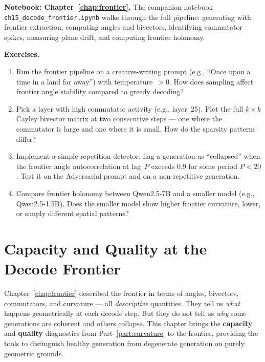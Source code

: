 \documentclass[11pt, twoside, openright]{memoir}
\numberwithin{equation}{chapter}
\begin{document}
\begin{tryit}
\textbf{Notebook: Chapter~\ref{chap:frontier}.}
The companion notebook
\texttt{ch15\_decode\_frontier.ipynb} walks through the full
pipeline: generating with frontier extraction, computing angles and
bivectors, identifying commutator spikes, measuring plane drift,
and computing frontier holonomy.

\medskip
\textbf{Exercises.}

\begin{enumerate}[nosep]
\item Run the frontier pipeline on a creative-writing prompt
  (e.g., ``Once upon a time in a land far away'') with
  temperature~$> 0$.  How does sampling affect frontier angle
  stability compared to greedy decoding?

\item Pick a layer with high commutator activity (e.g., layer~25).
  Plot the full $k \times k$ Cayley bivector matrix at two
  consecutive steps --- one where the commutator is large and one
  where it is small.  How do the sparsity patterns differ?

\item Implement a simple repetition detector: flag a generation as
  ``collapsed'' when the frontier angle autocorrelation at lag~$P$
  exceeds $0.9$ for some period $P < 20$.  Test it on the
  Adversarial prompt and on a non-repetitive generation.

\item Compare frontier holonomy between Qwen2.5-7B and a smaller
  model (e.g., Qwen2.5-1.5B).  Does the smaller model show
  higher frontier curvature, lower, or simply different spatial
  patterns?
\end{enumerate}
\end{tryit}


\chapter{Capacity and Quality at the Decode Frontier}
\label{chap:frontier-capacity}

\begin{whycare}
Chapter~\ref{chap:frontier} described the frontier in terms of
angles, bivectors, commutators, and curvature --- all
\emph{descriptive} quantities.  They tell us \emph{what} happens
geometrically at each decode step.
But they do not tell us \emph{why} some generations are coherent
and others collapse.
This chapter brings the \textbf{capacity} and \textbf{quality}
diagnostics from Part~\ref{part:curvature} to the frontier,
providing the tools to distinguish healthy generation from
degenerate generation on purely geometric grounds.
\end{whycare}
\end{document}
